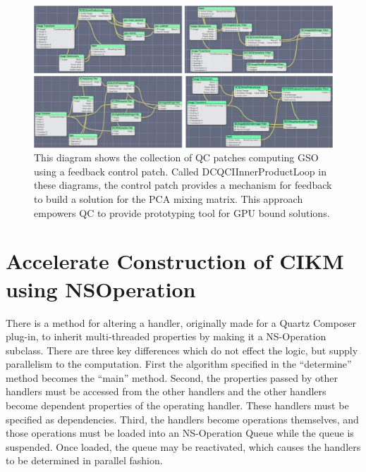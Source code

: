 \documentclass[11pt]{article}
\begin{document}
	\begin{figure}[htbp] %
	   \centering
	   \includegraphics[width=6in]{../../assignment1/combinedReport/controlLoopGSO.jpg} 
	   \caption{This diagram shows the collection of QC patches computing GSO using a feedback control patch.  Called DCQCIInnerProductLoop in these diagrams, the control patch provides a mechanism for feedback to build a solution for the PCA mixing matrix.  This approach empowers QC to provide prototyping tool for GPU bound solutions.}
	   \label{controlLoopGSO}
	\end{figure}



\section{Accelerate Construction of CIKM using NSOperation}\label{nsoperation-for-cifilter-generator}
There is a method for altering a handler, originally made for a Quartz Composer plug-in, to inherit multi-threaded properties by making it a NS-Operation subclass. %
There are three key differences which do not effect the logic, but supply parallelism to the computation.  First the algorithm specified in the ``determine'' method becomes the ``main'' method.  Second, the properties passed by other handlers must be accessed from the other handlers and the other handlers become dependent properties of the operating handler.  These handlers must be specified as dependencies.  Third, the handlers become operations themselves, and those operations must be loaded into an NS-Operation Queue while the queue is suspended.   Once loaded, the queue may be reactivated, which causes the handlers to be determined in parallel fashion.  
\end{document}
